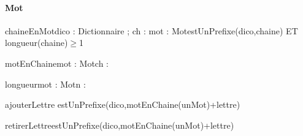 \paragraph{Mot}
\begin{algorithme}
  \signaturefonctionAvecPrecondition
  {chaineEnMot}{dico : Dictionnaire ; ch : \chaine}{mot : Mot}{estUnPrefixe(dico,chaine) ET longueur(chaine)$\geq$1}

  \signaturefonction
  {motEnChaine}{mot : Mot}{ch : \chaine}
  
  \signaturefonction
  {longueur}{mot : Mot}{n : \naturelNonNul}
  
  \signatureProcedureAvecPreconditions 
  {ajouterLettre}{ }{estUnPrefixe(dico,motEnChaine(unMot)+lettre)}
  
  \signatureProcedureAvecPreconditions 
  {retirerLettre}{}{estUnPrefixe(dico,motEnChaine(unMot)+lettre)}

\end{algorithme}
